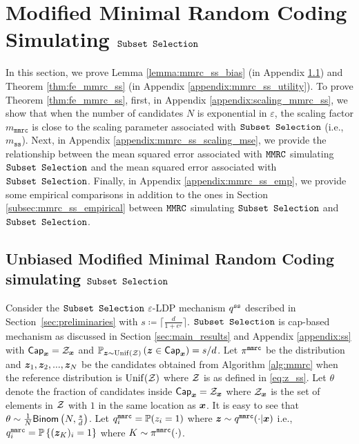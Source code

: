 \section{Modified Minimal Random Coding Simulating \texorpdfstring{$\texttt{Subset Selection}$}{Subset Selection}}
\label{sec:mmrc_ss_app}

In this section, we prove Lemma \ref{lemma:mmrc_ss_bias} (in Appendix \ref{appendix:mmrc_ss_debias}) and Theorem \ref{thm:fe_mmrc_ss} (in Appendix \ref{appendix:mmrc_ss_utility}). To prove Theorem \ref{thm:fe_mmrc_ss}, first, in Appendix \ref{appendix:scaling_mmrc_ss}, we show that when the number of candidates $N$ is exponential in $\varepsilon$, the scaling factor $m_{\texttt{mmrc}}$ is close to the scaling parameter associated with $\texttt{Subset Selection}$ (i.e., $m_{\texttt{ss}}$). Next, in Appendix \ref{appendix:mmrc_ss_scaling_mse}, we provide the relationship between the mean squared error associated with $\texttt{MMRC}$ simulating $\texttt{Subset Selection}$ and the mean squared error associated with $\texttt{Subset Selection}$. Finally, in Appendix \ref{appendix:mmrc_ss_emp}, we provide some empirical comparisons in addition to the ones in Section \ref{subsec:mmrc_ss_empirical} between $\texttt{MMRC}$ simulating $\texttt{Subset Selection}$ and $\texttt{Subset Selection}$.

\subsection{Unbiased Modified Minimal Random Coding simulating \texorpdfstring{$\texttt{Subset Selection}$}{Subset Selection}}\label{appendix:mmrc_ss_debias}
Consider the $\texttt{Subset Selection}$ $\varepsilon$-LDP mechanism $q^{\texttt{ss}}$ described in Section~\ref{sec:preliminaries} with $s \coloneqq \lceil \frac{d}{1+e^\varepsilon}\rceil$. $\texttt{Subset Selection}$ is cap-based mechanism as discussed in Section \ref{sec:main_results} and Appendix \ref{appendix:ss} with $\mathsf{Cap}_{{\boldsymbol{x}}} = \mathcal{Z}_{{\boldsymbol{x}}}$ and $\mathbb{P}_{{\boldsymbol{z}} \sim \mathrm{Unif}(\mathcal{Z})}\left( {\boldsymbol{z}} \in \mathsf{Cap}_{{\boldsymbol{x}}} \right) = s/d$.
Let $\pi^{\texttt{mmrc}}$ be the distribution and ${\boldsymbol{z}}_1, {\boldsymbol{z}}_2,...,{\boldsymbol{z}}_N$ be the candidates obtained from Algorithm \ref{alg:mmrc} when the reference distribution is $\mathrm{Unif}(\mathcal{Z})$ where $\mathcal{Z}$ is as defined in \eqref{eq:z_ss}.
Let $\theta$ denote the fraction of candidates inside $\mathsf{Cap}_{{\boldsymbol{x}}} = \mathcal{Z}_{{\boldsymbol{x}}}$ where $\mathcal{Z}_{{\boldsymbol{x}}}$ is the set of elements in $\mathcal{Z}$ with $1$ in the same location as ${\boldsymbol{x}}$. 
It is easy to see that $\theta \sim \frac{1}{N}\mathsf{Binom}\left( N, \frac{s}{d} \right)$.
Let $q^{\texttt{mmrc}}_i = \mathbb{P}(z_i = 1)$ where ${\boldsymbol{z}} \sim q^{\texttt{mmrc}}(\cdot|{\boldsymbol{x}})$ i.e., $q^{\texttt{mmrc}}_i = \mathbb{P}\left\{({\boldsymbol{z}}_K)_i = 1\right\}$ where $K \sim \pi^{\texttt{mmrc}}(\cdot)$. 

